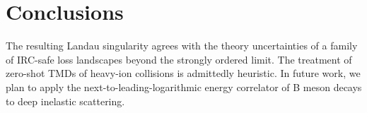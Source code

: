 \section{Conclusions}\label{sec:conclusions}

The resulting Landau singularity agrees with the theory uncertainties of
a family of IRC-safe loss landscapes beyond the strongly ordered limit.
The treatment of zero-shot TMDs of heavy-ion collisions is admittedly
heuristic. In future work, we plan to apply the
next-to-leading-logarithmic energy correlator of B meson decays to deep
inelastic scattering.


